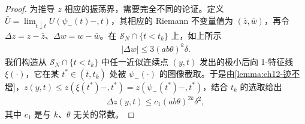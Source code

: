 \documentclass[../../main.tex]{subfiles}
\begin{document}
\begin{proof}
为推导 $z$ 相应的振荡界，需要完全不同的论证。定义 $\bar U=\lim_{t\downarrow\bar t}U(\psi_-(t)-,t)$，其相应的 Riemann 不变量值为 $(\bar z,\bar w)$，再令 $\Delta z=z-\bar z$、$\Delta w=w-\bar w$。在 $\mathscr{S}_N\cap\{t<t_k\}$ 上，如上所示
\begin{align}
|\Delta w|\leqslant 3(ab\theta)^k\delta.
\label{align:ch12-dw}
\end{align}
我们构造从 $\mathscr{S}_N\cap\{t<t_k\}$ 中任一近似连续点 $(y,t)$ 发出的极小后向 1-特征线 $\xi(\cdot)$，它在某 $t^*\in(\bar t,t_k)$ 处被 $\psi_-(\cdot)$ 的图像截取。于是由\cref{lemma:ch12-迹不增}，$z(y,t)\leqslant z(\xi(t^*)-,t^*)=z(\psi_-(t^*)-,t^*)$，结合 $t_k$ 的选取给出
\begin{align}
\Delta z(y,t)\leqslant c_1(ab\theta)^{2k}\delta^2,
\label{align:ch12-dz}
\end{align}
其中 $c_1$ 是与 $k$、$\theta$ 无关的常数。


\end{proof}
\end{document}
